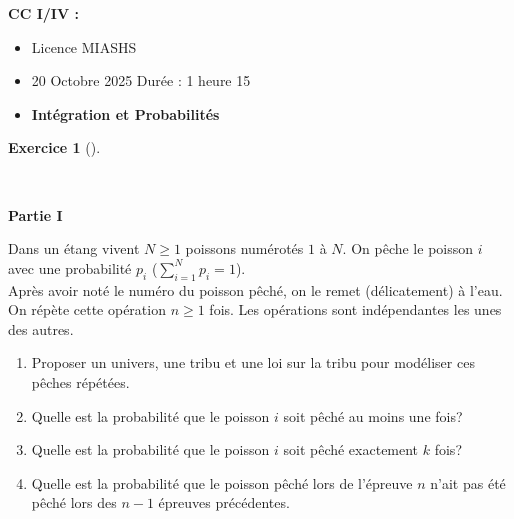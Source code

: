 \documentclass[
  french,
  11pt,
  a4paper,
  twoside,
  article,
  titlepage=false]{memoir}
\author{}
\date{2025-10-16}
\providecommand{\tightlist}{%
  \setlength{\itemsep}{0pt}\setlength{\parskip}{0pt}}
\theoremstyle{definition}
\newtheorem{exercise}{Exercice}[section]
\theoremstyle{remark}
\begin{document}
\frontmatter



\mainmatter
\begin{tcolorbox}[enhanced jigsaw, arc=.35mm, bottomrule=.15mm, breakable, colback=white, colframe=quarto-callout-note-color-frame, left=2mm, leftrule=.75mm, opacityback=0, rightrule=.15mm, toprule=.15mm]

\vspace{-3mm}\textbf{CC I/IV :}\vspace{3mm}

\begin{itemize}
\tightlist
\item
  Licence MIASHS
\item
  20 Octobre 2025 Durée : 1 heure 15
\item
  \textbf{Intégration et Probabilités}
\end{itemize}

\end{tcolorbox}

\begin{exercise}[]\protect\hypertarget{exr-1-a}{}\label{exr-1-a}

~

\end{exercise}

\textbf{Partie I}

Dans un étang vivent \(N\geqslant 1\) poissons numérotés \(1\) à \(N\).
On pêche le poisson \(i\) avec une probabilité \(p_i\)
(\(\sum_{i=1}^N  p_i=1\)).\\
Après avoir noté le numéro du poisson pêché, on le remet (délicatement)
à l'eau. On répète cette opération \(n\geq 1\) fois. Les opérations sont
indépendantes les unes des autres.

\begin{enumerate}
\def\labelenumi{\roman{enumi}.}
\tightlist
\item
  Proposer un univers, une tribu et une loi sur la tribu pour modéliser
  ces pêches répétées.
\item
  Quelle est la probabilité que le poisson \(i\) soit pêché au moins une
  fois?
\item
  Quelle est la probabilité que le poisson \(i\) soit pêché exactement
  \(k\) fois?
\item
  Quelle est la probabilité que le poisson pêché lors de l'épreuve \(n\)
  n'ait pas été pêché lors des \(n-1\) épreuves précédentes.
\end{enumerate}
\end{document}
